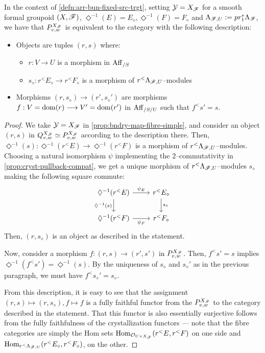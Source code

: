 \documentclass[11pt]{amsart}
\begin{document}
\begin{prop}\label{prop:frml-grpd-bndry-map-fibre}
In the context of \cref{defn:arr-bun-fixed-src-trgt}, setting $\mathcal{Y} = X_\mathscr{F}$ for
a smooth formal groupoid $(X, \mathscr{F})$,
$\Diamond^{-1}(E) = E_\diamond, \Diamond^{-1}(F) = F_\diamond$ and
$\Lambda_{\mathscr{F}, U} := pr_1^*\Lambda_{\mathscr{F}}$, we have that $P^{X_\mathscr{F}}_{v, w}$
is equivalent to the category with the following description:
\begin{itemize}
\item Objects are tuples $(r, s)$ where:
\begin{itemize}
\item $r : V \to U$ is a morphism in $\mathrm{Aff}_{/S}$
\item $s_\diamond : r^<E_\diamond \to r^<F_\diamond$ is a morphism of
$r^<\Lambda_{\mathscr{F}, U}$--modules
\end{itemize}
\item Morphisms $(r, s_\diamond) \to (r', s_\diamond')$ are morphisms
$f : V = \dom(r) \to V' = \dom(r')$ in $\mathrm{Aff}_{/S/U}$ such that
$f^<s' = s$.
\end{itemize}
\end{prop}
\begin{proof}
We take $\mathcal{Y} = X_\mathscr{F}$ in \cref{prop:bndry-map-fibre-simple}, and consider
an object $(r, s)$ in $Q^{X_\mathscr{F}}_{v, w} \simeq P^{X_\mathscr{F}}_{v, w}$ according to
the description there. Then,
$\Diamond^{-1}(s) : \Diamond^{-1}(r^<E) \to \Diamond^{-1}(r^<F)$ is a
morphism of $r^<\Lambda_{\mathscr{F}, U}$--modules. Choosing a natural
isomorphism $\psi$ implementing the $2$--commutativity in
\cref{prop:cryst-pullback-compat}, we get a unique morphism of
$r^<\Lambda_{\mathscr{F}, U}$--modules $s_\diamond$ making the following square commute:
\[\begin{tikzcd}
\Diamond^{-1}(r^<E) \ar[r, "\psi_{E}"] \ar[d, "\Diamond^{-1}(s)" left] &
r^<E_\diamond \ar[d, "s_\diamond"] \\
\Diamond^{-1}(r^<F) \ar[r, "\psi_{F}" below] &
r^<F_\diamond
\end{tikzcd}\]
Then, $(r, s_\diamond)$ is an object as described in the statement.

Now, consider a morphism $f : (r, s) \to (r', s')$ in $P^{X_\mathscr{F}}_{v, w}$.
Then, $f^<s' = s$ implies $\Diamond^{-1}(f^<s') = \Diamond^{-1}(s)$.
By the uniqueness of $s_\diamond$ and $s_\diamond'$ as in the previous paragraph,
we must have $f^<s_\diamond' = s_\diamond$.

From this description, it is easy to see that the assignment
$(r, s) \mapsto (r, s_\diamond), f \mapsto f$ is a fully faithful functor
from the $P^{X_\mathscr{F}}_{v, w}$ to the category described in the statement.
That this functor is also essentially surjective follows from the
fully faithfulness of the crystallization functors --- note that the fibre
categories are simply the Hom sets $\mathrm{Hom}_{\mathcal{O}_{U \times X_\mathscr{F}}}(r^<E, r^<F)$
on one side and $\mathrm{Hom}_{r^<\Lambda_{\mathscr{F}, U}}(r^<E_\diamond, r^<F_\diamond)$,
on the other.
\end{proof}
\end{document}
